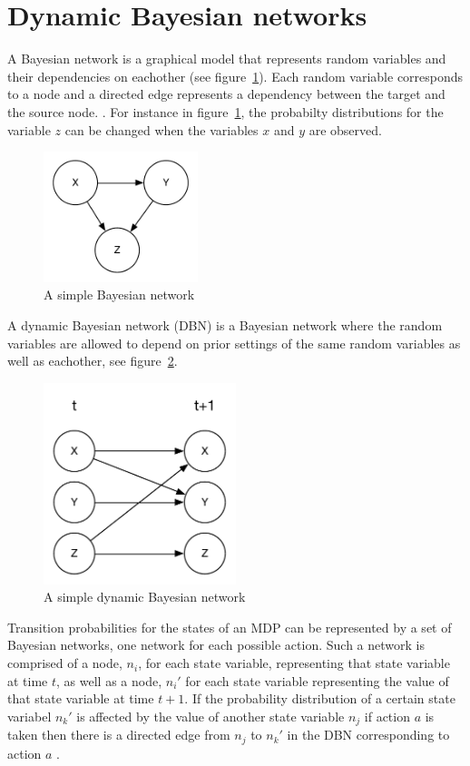 \section{Dynamic Bayesian networks}

A Bayesian network is a graphical model that represents random variables and
their dependencies on eachother (see figure~\ref{fig:bn}). Each random variable
corresponds to a node and a directed edge represents a dependency between the
target and the source node. \parencite{heckerman1998tutorial}. For instance in
figure~\ref{fig:bn}, the probabilty distributions for the variable $z$ can be
changed when the variables $x$ and $y$ are observed. 

\begin{figure}[H]
\centering
\includegraphics[width=0.4\textwidth]{images/BN.pdf}
\caption{A simple Bayesian network}
\label{fig:bn}
\end{figure}

A dynamic Bayesian network (DBN) is a Bayesian network where the random variables are allowed to depend on prior settings of the same random variables as well as eachother, see figure~\ref{fig:dbn}.


\begin{figure}[H]
    \centering
    \includegraphics[width=0.5\textwidth]{images/DBN.pdf}
    \caption{A simple dynamic Bayesian network}
    \label{fig:dbn}
\end{figure}

Transition probabilities for the states of an MDP can be represented by a set of Bayesian networks, one network for each possible action. Such a network is comprised of a node, $n_i$, for each state variable, representing that state variable at time $t$, as well as a node, $n_i'$ for each state variable representing the value of that state variable at time $t+1$. If the probability distribution of a certain state variabel $n_k'$ is affected by the value of another state variable $n_j$ if action $a$ is taken then there is a directed edge from $n_j$ to $n_k'$ in the DBN corresponding to action $a$ \parencite{guestrin2003efficient}.

